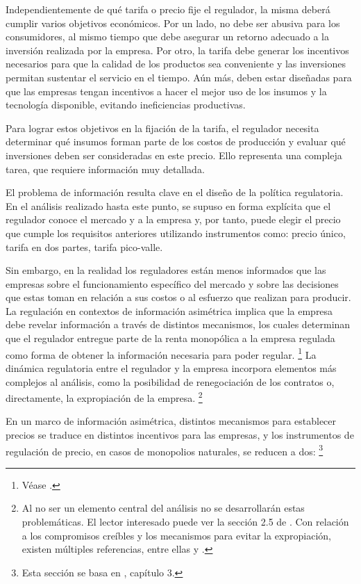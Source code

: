 \documentclass[
  12pt,
  spanish,
]{book}
\begin{document}
Independientemente de qué tarifa o precio fije el regulador, la misma
deberá cumplir varios objetivos económicos. Por un lado, no debe ser
abusiva para los consumidores, al mismo tiempo que debe asegurar un
retorno adecuado a la inversión realizada por la empresa. Por otro, la
tarifa debe generar los incentivos necesarios para que la calidad de los
productos sea conveniente y las inversiones permitan sustentar el
servicio en el tiempo. Aún más, deben estar diseñadas para que las
empresas tengan incentivos a hacer el mejor uso de los insumos y la
tecnología disponible, evitando ineficiencias productivas.

Para lograr estos objetivos en la fijación de la tarifa, el regulador
necesita determinar qué insumos forman parte de los costos de producción
y evaluar qué inversiones deben ser consideradas en este precio. Ello
representa una compleja tarea, que requiere información muy detallada.

El problema de información resulta clave en el diseño de la política
regulatoria. En el análisis realizado hasta este punto, se supuso en
forma explícita que el regulador conoce el mercado y a la empresa y, por
tanto, puede elegir el precio que cumple los requisitos anteriores
utilizando instrumentos como: precio único, tarifa en dos partes, tarifa
pico-valle.

Sin embargo, en la realidad los reguladores están menos informados que
las empresas sobre el funcionamiento específico del mercado y sobre las
decisiones que estas toman en relación a sus costos o al esfuerzo que
realizan para producir. La regulación en contextos de información
asimétrica implica que la empresa debe revelar información a través de
distintos mecanismos, los cuales determinan que el regulador entregue
parte de la renta monopólica a la empresa regulada como forma de obtener
la información necesaria para poder regular. \footnote{Véase
  \citet{Baron1982}.} La dinámica regulatoria entre el regulador y la
empresa incorpora elementos más complejos al análisis, como la
posibilidad de renegociación de los contratos o, directamente, la
expropiación de la empresa. \footnote{Al no ser un elemento central del
  análisis no se desarrollarán estas problemáticas. El lector interesado
  puede ver la sección 2.5 de \citet{Armstrong2007}. Con relación a los
  compromisos creíbles y los mecanismos para evitar la expropiación,
  existen múltiples referencias, entre ellas \citet{Bergara2003} y
  \citet{Spiller2013}.}

En un marco de información asimétrica, distintos mecanismos para
establecer precios se traduce en distintos incentivos para las empresas,
y los instrumentos de regulación de precio, en casos de monopolios
naturales, se reducen a dos: \footnote{Esta sección se basa en
  \citet{Armstrong2007}, capítulo 3.}
\end{document}
